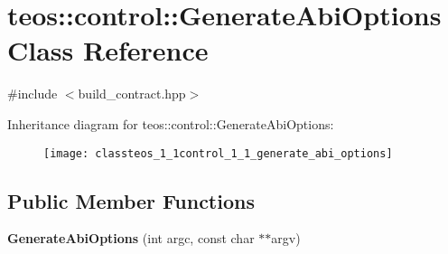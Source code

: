 \hypertarget{classteos_1_1control_1_1_generate_abi_options}{}\section{teos\+:\+:control\+:\+:Generate\+Abi\+Options Class Reference}
\label{classteos_1_1control_1_1_generate_abi_options}


{\ttfamily \#include $<$build\+\_\+contract.\+hpp$>$}

Inheritance diagram for teos\+:\+:control\+:\+:Generate\+Abi\+Options\+:\begin{figure}[H]
\begin{center}
\leavevmode
\texttt{[image: classteos\_1\_1control\_1\_1\_generate\_abi\_options]}
\end{center}
\end{figure}
\subsection*{Public Member Functions}
\begin{DoxyCompactItemize}
\item 
\mbox{\label{classteos_1_1control_1_1_generate_abi_options_addfa748467e9f424013802106132924a}} 
{\bfseries Generate\+Abi\+Options} (int argc, const char $\ast$$\ast$argv)
\end{DoxyCompactItemize}
